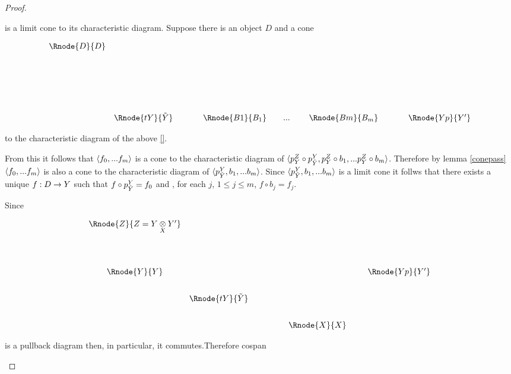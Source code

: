 \documentclass[10pt,a4paper]{scrartcl}
\begin{document}
\begin{proof}
\begin{enumerate}[(i)]
 is a limit cone to its characteristic diagram.
Suppose there is an object $D$ and a cone 
\begin{center}
\begin{displaymath}
\begin{array}{c c p{0.4cm} c p{0.4cm} c }
\Rnode{D}{D}&  && &&      \\ [2.6cm]
      & \Rnode{tY}{\pbase{Y}}&& \begin{array}{cp{0cm}c   p{0.1cm}     c  }					
                             \Rnode{B1}{B_1}&   & ... & & \Rnode{Bm}{B_m}
	                      \end{array} 
	 && \Rnode{Yp}{Y'}                                              
\end{array} 
\end{displaymath}
\end{center}
to the characteristic diagram of the above \ref{}.

From this it follows that $\langle f_0,...f_m\rangle$ is a cone to the characteristic diagram of
$\langle p^{Z}_{Y} \circ p^{Y}_{\tilde{Y}}, p^{Z}_{Y} \circ b_1, ... p^{Z}_{Y} \circ b_m\rangle$.
Therefore by lemma \ref{conepass} $\langle f_0,...f_m\rangle$ is also a cone to the characteristic
diagram of $\langle p^{Y}_{\tilde{Y}}, b_1, ... b_m\rangle$. Since $\langle p^{Y}_{\tilde{Y}}, b_1, ... b_m\rangle$ is a limit cone it follws that there exists a unique $f:D \rightarrow Y$ such that $f\circ p^{Y}_{\tilde{Y}}=f_0$ and , for each $j$, $1 \leq j \leq m$, $f \circ b_j=f_j$.

\noindent Since
\begin{center}
\begin{displaymath}
\begin{array}{c c p{1.0cm} c p{0.2cm}c}
  \Rnode{Z}{Z=\crossx{Y}{Y'}{X}} & &                       & &  &                  \\ [1.6cm]
  \Rnode{Y}{Y} & &                       & &  & \Rnode{Yp}{Y'}   \\ [0.7cm]
	             &  \Rnode{tY}{\pbase{Y}} & &  &                  \\ [0.7cm]
	             & &                       & \Rnode{X}{X} & & 
\end{array} 
\end{displaymath}
\end{center} 
is a pullback diagram then, in particular, it commutes.Therefore cospan 



\end{enumerate}
\end{proof}
\end{document}
